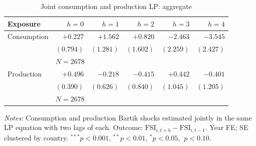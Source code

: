 \begin{table}[htbp]
\centering
\caption{Joint consumption and production LP: aggregate}
\label{tab:joint-lp}
\begin{threeparttable}\small
\begin{tabular}{lrrrrr}
\toprule
Exposure & $h=0$ & $h=1$ & $h=2$ & $h=3$ & $h=4$ \\
\midrule
Consumption & $+0.227$ & $+1.562$ & $+0.820$ & $-2.463$ & $-3.545$ \\
& $(0.794)$ & $(1.281)$ & $(1.602)$ & $(2.259)$ & $(2.427)$ \\
& \multicolumn{5}{l}{$N = 2678$} \\[2pt]
Production & $+0.496$ & $-0.218$ & $-0.415$ & $+0.442$ & $-0.401$ \\
& $(0.390)$ & $(0.626)$ & $(0.840)$ & $(1.045)$ & $(1.205)$ \\
& \multicolumn{5}{l}{$N = 2678$} \\[2pt]
\bottomrule
\end{tabular}
\begin{tablenotes}\small
\item \textit{Notes:} Consumption and production Bartik shocks estimated jointly in the same LP equation with two lags of each. Outcome: $\text{FSI}_{i,t+h} - \text{FSI}_{i,t-1}$. Year FE; SE clustered by country. $^{***}p<0.001$, $^{**}p<0.01$, $^{*}p<0.05$, $^{\cdot}p<0.10$.
\end{tablenotes}\end{threeparttable}\end{table}

